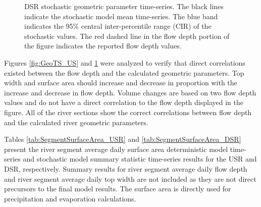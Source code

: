 \begin{landscape}
\begin{figure}
\begin{subfigure}{0.7\textwidth}
		\end{subfigure}
		\caption[DSR stochastic geometric parameter time-series.]{DSR stochastic geometric parameter time-series. The black lines indicate the stochastic model mean time-series.  The blue band indicates the 95\% central inter-percentile range (CIR) of the stochastic values.  The red dashed line in the flow depth portion of the figure indicates the reported flow depth values.}
		\label{fig:GeoTS_DS}
	\end{figure}
\end{landscape}

Figures \ref{fig:GeoTS_US} and \ref{fig:GeoTS_DS} were analyzed to verify that direct correlations existed between the flow depth and the calculated geometric parameters.  Top width and surface area should increase and decrease in proportion with the increase and decrease in flow depth.  Volume changes are based on two flow depth values and do not have a direct correlation to the flow depth displayed in the figure.  All of the river sections show the correct correlations between flow depth and the calculated river geometric parameters.

Tables \ref{tab:SegmentSurfaceArea_USR} and \ref{tab:SegmentSurfaceArea_DSR} present the river segment average daily surface area deterministic model time-series and stochastic model summary statistic time-series results for the USR and DSR, respectively.  Summary results for river segment average daily flow depth and river segment average daily top width are not included as they are not direct precursors to the final model results.  The surface area is directly used for precipitation and evaporation calculations.

